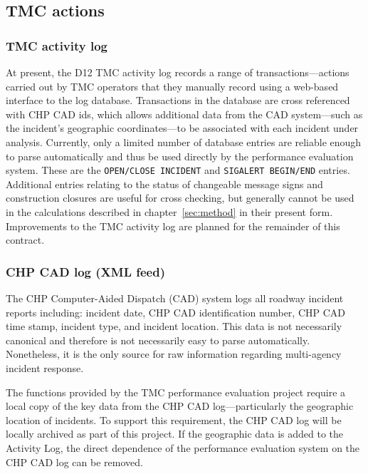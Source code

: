 \documentclass[12pt]{report}
\begin{document}
\subsection{TMC actions}
\label{sec:tmc-actions}


\subsubsection{TMC activity log}

At present, the D12 TMC activity log records a range of transactions---actions
carried out by TMC operators that they manually record using a web-based
interface to the log database.  Transactions in the database are cross
referenced with CHP CAD ids, which allows additional data from the CAD
system---such as the incident's geographic coordinates---to be associated with
each incident under analysis.  Currently, only a limited number of database
entries are reliable enough to parse automatically and thus be used directly by
the performance evaluation system.  These are the \texttt{OPEN/CLOSE INCIDENT}
and \texttt{SIGALERT BEGIN/END} entries.  Additional entries relating to the
status of changeable message signs and construction closures are useful for
cross checking, but generally cannot be used in the calculations described in
chapter~\ref{sec:method} in their present form.  Improvements to the TMC
activity log are planned for the remainder of this contract.


\subsubsection{CHP CAD log (XML feed)}

The CHP Computer-Aided Dispatch (CAD) system logs all roadway incident reports
including: incident date, CHP CAD identification number, CHP CAD time stamp,
incident type, and incident location. This data is not necessarily canonical and
therefore is not necessarily easy to parse automatically. Nonetheless, it is the
only source for raw information regarding multi-agency incident response.

The functions provided by the TMC performance evaluation project require a local
copy of the key data from the CHP CAD log---particularly the geographic location
of incidents.  To support this requirement, the CHP CAD log will be locally
archived as part of this project.  If the geographic data is added to the
Activity Log, the direct dependence of the performance evaluation system on the
CHP CAD log can be removed.
\end{document}
